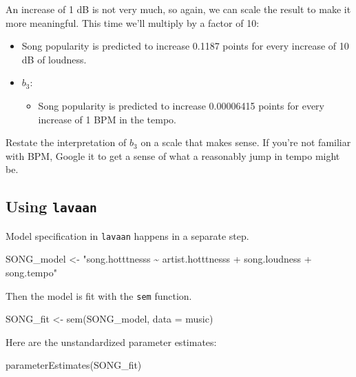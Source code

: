 \documentclass[
]{book}
\newenvironment{Shaded}{\begin{snugshade}}{\end{snugshade}}
\newcommand{\AttributeTok}[1]{\textcolor[rgb]{0.77,0.63,0.00}{#1}}
\newcommand{\FunctionTok}[1]{\textcolor[rgb]{0.00,0.00,0.00}{#1}}
\newcommand{\NormalTok}[1]{#1}
\newcommand{\OtherTok}[1]{\textcolor[rgb]{0.56,0.35,0.01}{#1}}
\newcommand{\StringTok}[1]{\textcolor[rgb]{0.31,0.60,0.02}{#1}}
\providecommand{\tightlist}{%
  \setlength{\itemsep}{0pt}\setlength{\parskip}{0pt}}
\begin{document}
An increase of 1 dB is not very much, so again, we can scale the result to make it more meaningful. This time we'll multiply by a factor of 10:

\begin{itemize}
\item
  Song popularity is predicted to increase 0.1187 points for every increase of 10 dB of loudness.
\item
  \(b_{3}\):

  \begin{itemize}
  \tightlist
  \item
    Song popularity is predicted to increase 0.00006415 points for every increase of 1 BPM in the tempo.
  \end{itemize}
\end{itemize}

Restate the interpretation of \(b_{3}\) on a scale that makes sense. If you're not familiar with BPM, Google it to get a sense of what a reasonably jump in tempo might be.

\hypertarget{multiple-r-lavaan}{%
\subsection{\texorpdfstring{Using \texttt{lavaan}}{Using lavaan}}\label{multiple-r-lavaan}}

Model specification in \texttt{lavaan} happens in a separate step.

\begin{Shaded}
\begin{Highlighting}[]
\NormalTok{SONG\_model }\OtherTok{\textless{}{-}} \StringTok{"song.hotttnesss \textasciitilde{} artist.hotttnesss +}
\StringTok{    song.loudness + }
\StringTok{    song.tempo"} 
\end{Highlighting}
\end{Shaded}

Then the model is fit with the \texttt{sem} function.

\begin{Shaded}
\begin{Highlighting}[]
\NormalTok{SONG\_fit }\OtherTok{\textless{}{-}} \FunctionTok{sem}\NormalTok{(SONG\_model, }\AttributeTok{data =}\NormalTok{ music)}
\end{Highlighting}
\end{Shaded}

Here are the unstandardized parameter estimates:

\begin{Shaded}
\begin{Highlighting}[]
\FunctionTok{parameterEstimates}\NormalTok{(SONG\_fit)}
\end{Highlighting}
\end{Shaded}
\end{document}
